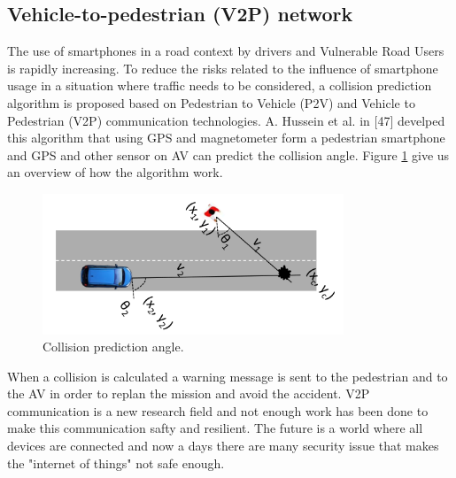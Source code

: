     \subsection{Vehicle-to-pedestrian (V2P) network}
    The use of smartphones in a road context by drivers and Vulnerable Road Users is rapidly increasing. To reduce the risks related to the influence of smartphone usage in a situation where traffic needs to be considered, a collision prediction algorithm is proposed based on Pedestrian to Vehicle (P2V) and Vehicle to Pedestrian (V2P) communication technologies. A. Hussein et al. in [47] develped this algorithm that using GPS and magnetometer form a pedestrian smartphone and GPS and other sensor on AV can predict the collision angle. 
    \newline
    Figure \ref{fig:Collision} give us an overview of how the algorithm work.
    \begin{figure}
        \centering
        \includegraphics[width=9cm]{./files/Schermata da 2020-02-18 10-20-30.png}
        \caption{Collision prediction angle.}
        \label{fig:Collision}
    \end{figure}
    \newline
    When a collision is calculated a warning message is sent to the pedestrian and to the AV in order to replan the mission and avoid the accident. 
    \newline
    V2P communication is a new research field and not enough work has been done to make this communication safty and resilient. The future is a world where all devices are connected and now a days there are many security issue that makes the "internet of things" not safe enough. 